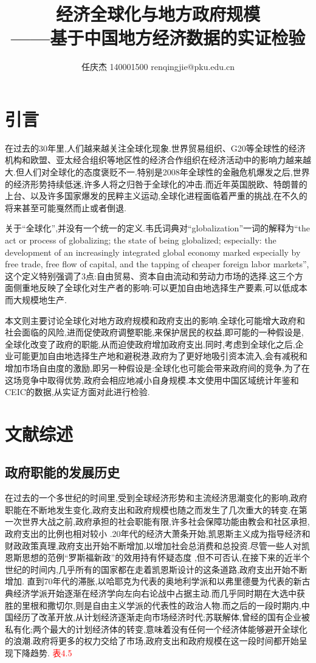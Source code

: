 \documentclass[10pt]{article}
\author{任庆杰  140001500  renqingjie@pku.edu.cn}
\title{经济全球化与地方政府规模\\
——基于中国地方经济数据的实证检验}
\begin{document}
\maketitle{}
\section{引言}
    在过去的30年里,人们越来越关注全球化现象.世界贸易组织、G20等全球性的经济机构和欧盟、亚太经合组织等地区性的经济合作组织在经济活动中的影响力越来越大.但人们对全球化的态度褒贬不一.特别是2008年全球性的金融危机爆发之后,世界的经济形势持续低迷,许多人将之归咎于全球化的冲击.而近年英国脱欧、特朗普的上台、以及许多国家爆发的民粹主义运动,全球化进程面临着严重的挑战,在不久的将来甚至可能戛然而止或者倒退.

    关于“全球化”,并没有一个统一的定义.韦氏词典对“globalization”一词的解释为“the act or process of globalizing; the state of being globalized; especially: the development of an increasingly integrated global economy marked especially by free trade, free flow of capital, and the tapping of cheaper foreign labor markets”,这个定义特别强调了3点:自由贸易、资本自由流动和劳动力市场的选择.这三个方面侧重地反映了全球化对生产者的影响:可以更加自由地选择生产要素,可以低成本而大规模地生产.

    本文则主要讨论全球化对地方政府规模和政府支出的影响.全球化可能增大政府和社会面临的风险,进而促使政府调整职能,来保护居民的权益,即可能的一种假设是,全球化改变了政府的职能,从而迫使政府增加政府支出.同时,考虑到全球化之后,企业可能更加自由地选择生产地和避税港,政府为了更好地吸引资本流入,会有减税和增加市场自由度的激励,即另一种假设是:全球化也可能会带来政府间的竞争,为了在这场竞争中取得优势,政府会相应地减小自身规模.本文使用中国区域统计年鉴和CEIC的数据,从实证方面对此进行检验.

\section{文献综述}
    \subsection{政府职能的发展历史}
    在过去的一个多世纪的时间里,受到全球经济形势和主流经济思潮变化的影响,政府职能在不断地发生变化,政府支出和政府规模也随之而发生了几次重大的转变.在第一次世界大战之前,政府承担的社会职能有限,许多社会保障功能由教会和社区承担,政府支出的比例也相对较小 \cite{Beito2002The} .20年代的经济大萧条开始,凯恩斯主义成为指导经济和财政政策真理,政府支出开始不断增加,以增加社会总消费和总投资.尽管一些人对凯恩斯思想的范例“罗斯福新政”的效用持有怀疑态度 \cite{rothbard1972america},但不可否认,在接下来的近半个世纪的时间内,几乎所有的国家都在走着凯恩斯设计的这条道路,政府支出开始不断增加.
    直到70年代的滞胀,以哈耶克为代表的奥地利学派和以弗里德曼为代表的新古典经济学派开始逐渐在经济学向左向右论战中占据主动.而几乎同时期在大选中获胜的里根和撒切尔,则是自由主义学派的代表性的政治人物.而之后的一段时期内,中国经历了改革开放,从计划经济逐渐走向市场经济时代;苏联解体,曾经的国有企业被私有化;两个最大的计划经济体的转变,意味着没有任何一个经济体能够避开全球化的浪潮.政府将更多的权力交给了市场,政府支出和政府规模在这一段时间都开始呈现下降趋势.
    \textcolor{red}{表4.5}
\end{document}
